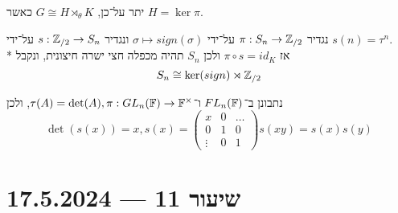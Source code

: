 \begin{remark}
	יתר על־כן, $G \cong H \rtimes_\theta K$ כאשר $H = \ker \pi$.
\end{remark}
\begin{example}
	נגדיר $\pi : S_n \to \mathbb{Z}_{/2}$ על־ידי $\sigma \mapsto sign(\sigma)$ ונגדיר $s : \mathbb{Z}_{/2} \to S_n$ על־ידי $s(n) =\tau^n$. \\*
	אז $\pi \circ s = id_K$ ולכן $S_n$ תהיה מכפלה חצי ישרה חיצונית, ונקבל
	\[
		S_n \cong \ker(sign) \rtimes \mathbb{Z}_{/2}
	\]
\end{example}
\begin{example}
	נתבונן ב־$FL_n(\mathbb{F})$ ו־$\tau(A) = \det(A), \pi : GL_n(\mathbb{F}) \to \mathbb{F}^\times$, ולכן
	\[
		\det(s(x)) = x, s(x) = \begin{pmatrix}
			x & 0 & \dots \\
			0 & 1 & 0 \\
			\vdots & 0 & 1
		\end{pmatrix}
		s(xy) = s(x)s(y)
	\]
\end{example}

\section{שיעור 11 --- 17.5.2024}
